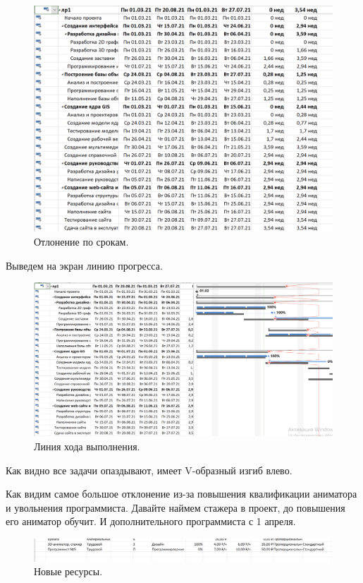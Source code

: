 \documentclass[a4paper,14pt]{extreport} %
\begin{document}
\begin{enumerate}
\begin{figure}[H]
  \centering
  \caption{Отлонение по срокам. }
  \includegraphics[scale=0.5]{15}
\end{figure}

Выведем на экран линию прогресса.

\begin{figure}[H]
  \centering
  \caption{Линия хода выполнения. }
  \includegraphics[scale=0.4]{17}
\end{figure}

Как видно все задачи опаздывают, имеет V-образный изгиб влево.

Как видим самое большое отклонение из-за повышения квалификации аниматора и увольнения программиста. Давайте наймем стажера в проект, до повышения его аниматор обучит. И дополнительного программиста с 1 апреля.

\begin{figure}[H]
  \centering
  \caption{Новые ресурсы. }
  \includegraphics[scale=0.5]{16}
\end{figure}


\end{enumerate}
\end{document}
